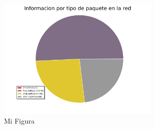 \begin{figure}[h!]
  \centering
   \includegraphics[width=0.7\textwidth]{graficos/red_domestica_pie_type_information.png}
  \caption{Mi Figura}
  \label{fig:red_domestica_pie_type_information}
\end{figure}